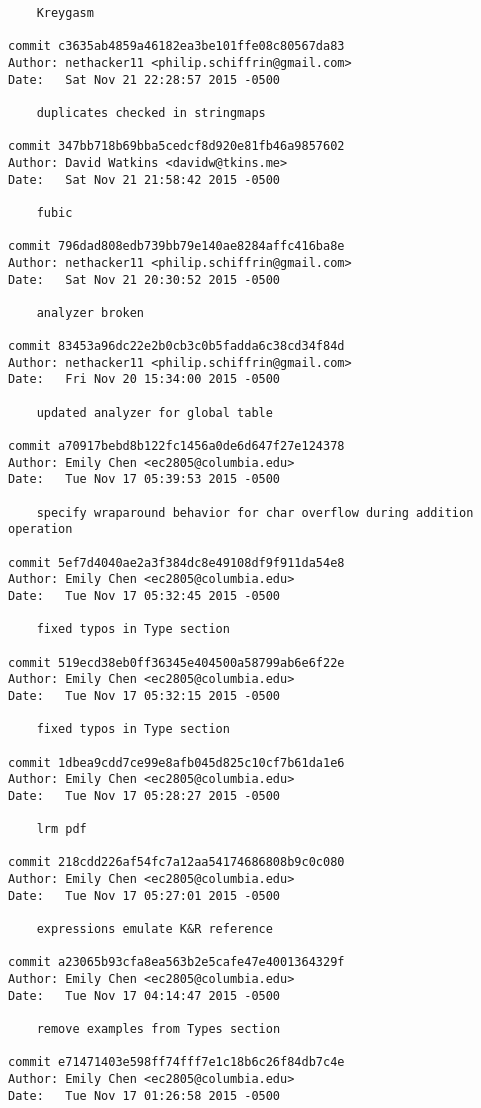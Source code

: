 \begin{verbatim}
    Kreygasm

commit c3635ab4859a46182ea3be101ffe08c80567da83
Author: nethacker11 <philip.schiffrin@gmail.com>
Date:   Sat Nov 21 22:28:57 2015 -0500

    duplicates checked in stringmaps

commit 347bb718b69bba5cedcf8d920e81fb46a9857602
Author: David Watkins <davidw@tkins.me>
Date:   Sat Nov 21 21:58:42 2015 -0500

    fubic

commit 796dad808edb739bb79e140ae8284affc416ba8e
Author: nethacker11 <philip.schiffrin@gmail.com>
Date:   Sat Nov 21 20:30:52 2015 -0500

    analyzer broken

commit 83453a96dc22e2b0cb3c0b5fadda6c38cd34f84d
Author: nethacker11 <philip.schiffrin@gmail.com>
Date:   Fri Nov 20 15:34:00 2015 -0500

    updated analyzer for global table

commit a70917bebd8b122fc1456a0de6d647f27e124378
Author: Emily Chen <ec2805@columbia.edu>
Date:   Tue Nov 17 05:39:53 2015 -0500

    specify wraparound behavior for char overflow during addition operation

commit 5ef7d4040ae2a3f384dc8e49108df9f911da54e8
Author: Emily Chen <ec2805@columbia.edu>
Date:   Tue Nov 17 05:32:45 2015 -0500

    fixed typos in Type section

commit 519ecd38eb0ff36345e404500a58799ab6e6f22e
Author: Emily Chen <ec2805@columbia.edu>
Date:   Tue Nov 17 05:32:15 2015 -0500

    fixed typos in Type section

commit 1dbea9cdd7ce99e8afb045d825c10cf7b61da1e6
Author: Emily Chen <ec2805@columbia.edu>
Date:   Tue Nov 17 05:28:27 2015 -0500

    lrm pdf

commit 218cdd226af54fc7a12aa54174686808b9c0c080
Author: Emily Chen <ec2805@columbia.edu>
Date:   Tue Nov 17 05:27:01 2015 -0500

    expressions emulate K&R reference

commit a23065b93cfa8ea563b2e5cafe47e4001364329f
Author: Emily Chen <ec2805@columbia.edu>
Date:   Tue Nov 17 04:14:47 2015 -0500

    remove examples from Types section

commit e71471403e598ff74fff7e1c18b6c26f84db7c4e
Author: Emily Chen <ec2805@columbia.edu>
Date:   Tue Nov 17 01:26:58 2015 -0500


\end{verbatim}
